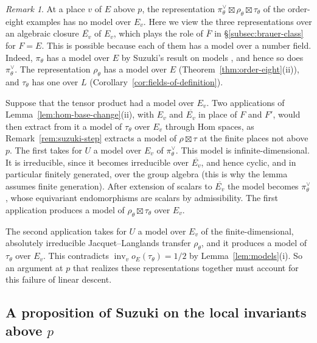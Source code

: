 \documentclass[a4paper,11pt]{amsart}
\theoremstyle{definition}
\theoremstyle{remark}
\newtheorem{remark}[theorem]{Remark}
\numberwithin{equation}{section}
\DeclareMathOperator{\inv}{inv}
\begin{document}
\begin{remark}\label{rem:hom-lemma}
At a place $v$ of $E$ above $p$, the representation $\pi_\theta^\vee\boxtimes\rho_\theta\boxtimes\tau_\theta$ of the order-eight examples has no model over $E_v$. Here we view the three representations over an algebraic closure $\overline{E_v}$ of $E_v$, which plays the role of $\overline F$ in \S\ref{subsec:brauer-class} for $F=E$. This is possible because each of them has a model over a number field. Indeed, $\pi_\theta$ has a model over $E$ by Suzuki's result on models \cite[Lemma~4.0.4]{Su23}, and hence so does $\pi_\theta^\vee$. The representation $\rho_\theta$ has a model over $E$ (Theorem~\ref{thm:order-eight}(ii)), and $\tau_\theta$ has one over $L$ (Corollary~\ref{cor:fields-of-definition}).

Suppose that the tensor product had a model over $E_v$. Two applications of Lemma~\ref{lem:hom-base-change}(ii), with $E_v$ and $\overline{E_v}$ in place of $F$ and $F'$, would then extract from it a model of $\tau_\theta$ over $E_v$ through Hom spaces, as Remark~\ref{rem:suzuki-step} extracts a model of $\rho\boxtimes\tau$ at the finite places not above $p$. The first takes for $U$ a model over $E_v$ of $\pi_\theta^\vee$. This model is infinite-dimensional. It is irreducible, since it becomes irreducible over $\overline{E_v}$, and hence cyclic, and in particular finitely generated, over the group algebra (this is why the lemma assumes finite generation). After extension of scalars to $\overline{E_v}$ the model becomes $\pi_\theta^\vee$, whose equivariant endomorphisms are scalars by admissibility. The first application produces a model of $\rho_\theta\boxtimes\tau_\theta$ over $E_v$.

The second application takes for $U$ a model over $E_v$ of the finite-dimensional, absolutely irreducible Jacquet--Langlands transfer $\rho_\theta$, and it produces a model of $\tau_\theta$ over $E_v$. This contradicts $\inv_v o_E(\tau_\theta)=1/2$ by Lemma~\ref{lem:models}(i). So an argument at $p$ that realizes these representations together must account for this failure of linear descent.
\end{remark}

\subsection{A proposition of Suzuki on the local invariants above \texorpdfstring{$p$}{p}}\label{subsec:dyadic}
\end{document}
